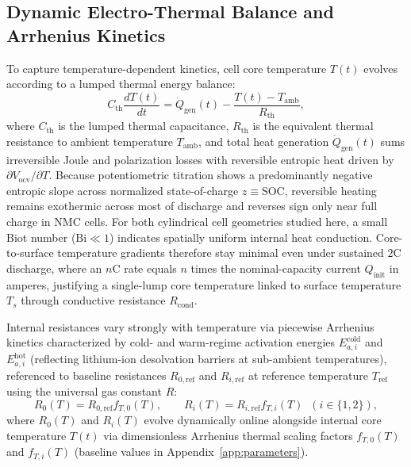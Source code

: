 \documentclass[10pt,a4paper]{article}
\begin{document}
\subsection{Dynamic Electro-Thermal Balance and Arrhenius Kinetics}
To capture temperature-dependent kinetics, cell core temperature $T(t)$ evolves according to a lumped thermal energy balance:
\begin{equation}\label{eqn:thermal_balance}
C_{\text{th}} \frac{d T(t)}{dt} = \dot{Q}_{\text{gen}}(t) - \frac{T(t) - T_{\text{amb}}}{R_{\text{th}}},
\end{equation}
where $C_{\text{th}}$ is the lumped thermal capacitance, $R_{\text{th}}$ is the equivalent thermal resistance to ambient temperature $T_{\text{amb}}$, and total heat generation $\dot{Q}_{\text{gen}}(t)$ sums irreversible Joule and polarization losses with reversible entropic heat driven by $\partial V_{\text{ocv}}/\partial T$. Because potentiometric titration shows a predominantly negative entropic slope across normalized state-of-charge $z \equiv \text{SOC}$, reversible heating remains exothermic across most of discharge and reverses sign only near full charge in NMC cells. For both cylindrical cell geometries studied here, a small Biot number ($\text{Bi} \ll 1$) indicates spatially uniform internal heat conduction. Core-to-surface temperature gradients therefore stay minimal even under sustained $2\text{C}$ discharge, where an $n\text{C}$ rate equals $n$ times the nominal-capacity current $Q_{\text{init}}$ in amperes, justifying a single-lump core temperature linked to surface temperature $T_s$ through conductive resistance $R_{\text{cond}}$.

Internal resistances vary strongly with temperature via piecewise Arrhenius kinetics characterized by cold- and warm-regime activation energies $E_{a,i}^{\text{cold}}$ and $E_{a,i}^{\text{hot}}$ (reflecting lithium-ion desolvation barriers at sub-ambient temperatures), referenced to baseline resistances $R_{0,\text{ref}}$ and $R_{i,\text{ref}}$ at reference temperature $T_{\text{ref}}$ using the universal gas constant $R$:
\begin{equation}
R_0(T) = R_{0,\text{ref}} f_{T,0}(T), \qquad R_i(T) = R_{i,\text{ref}} f_{T,i}(T) \;\; (i \in \{1, 2\}), \label{eqn:arrh_ri}
\end{equation}
where $R_0(T)$ and $R_i(T)$ evolve dynamically online alongside internal core temperature $T(t)$ via dimensionless Arrhenius thermal scaling factors $f_{T,0}(T)$ and $f_{T,i}(T)$ (baseline values in Appendix~\ref{app:parameters}).
\end{document}
